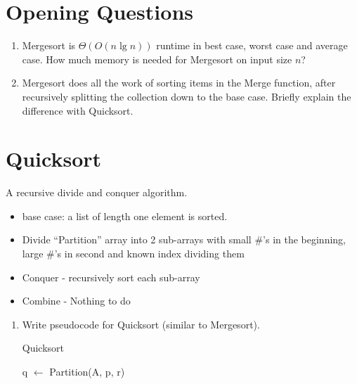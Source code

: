 \documentclass[12pt]{report}
\begin{document}
\listofalgorithms

\section{Opening Questions}\label{sec:opening-questions}
\begin{enumerate}[label=\arabic*.]
    \item Mergesort is $\Theta(O(n\lg n))$ runtime in best case, worst case and average case. How much memory is needed for Mergesort on input size $n$? 
	\item Mergesort does all the work of sorting items in the Merge function, after recursively splitting the collection down to the base case. Briefly explain the difference with Quicksort.
\end{enumerate}

\section{Quicksort}\label{sec:quicksort}
\noindent A recursive divide and conquer algorithm.
\begin{itemize}
	\item base case: a list of length one element is sorted.
	\item Divide ``Partition'' array into 2 sub-arrays with small \#'s in the beginning, large \#'s in second and known index dividing them
	\item Conquer - recursively sort each sub-array
	\item Combine - Nothing to do
\end{itemize}
\begin{enumerate}[label=\arabic*.]
    \item Write pseudocode for Quicksort (similar to Mergesort).\begin{algorithm}[H]
    		\caption{Quicksort}\label{alg:quicksort}
    		\begin{algorithmic}[1]
					\State q $\gets$ Partition(A, p, r)
					\State {}
					\State {}
				\EndIf
    		\EndFunction
    		\end{algorithmic}
    	\end{algorithm}
\end{enumerate}
\end{document}
